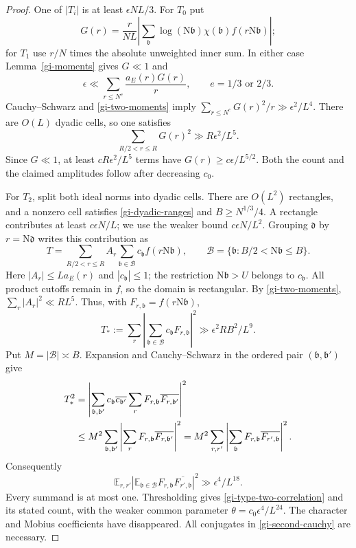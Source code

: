 \begin{proof}
One of $|T_i|$ is at least $\epsilon NL/3$.  For $T_0$ put
\[
 G(r)=\frac{r}{NL}\left|\sum_{\mathfrak b}\log(\mathrm N\mathfrak b)
                   \chi(\mathfrak b)f(r\mathrm N\mathfrak b)\right|;
\]
for $T_1$ use $r/N$ times the absolute unweighted inner sum.  In either
case Lemma~\ref{gi-moments} gives $G\ll1$ and
\[
 \epsilon\ll\sum_{r\leq N^e}\frac{a_E(r)G(r)}r,
 \qquad e=1/3\text{ or }2/3.
\]
Cauchy--Schwarz and \eqref{gi-two-moments} imply
$\sum_{r\leq N^e}G(r)^2/r\gg\epsilon^2/L^4$.
There are $O(L)$ dyadic cells, so one satisfies
\[
 \sum_{R/2<r\leq R}G(r)^2\gg R\epsilon^2/L^5.
\]
Since $G\ll1$, at least $cR\epsilon^2/L^5$ terms have
$G(r)\geq c\epsilon/L^{5/2}$.  Both the count and the claimed amplitudes
follow after decreasing $c_0$.

For $T_2$, split both ideal norms into dyadic cells.  There are $O(L^2)$
rectangles, and a nonzero cell satisfies \eqref{gi-dyadic-ranges} and
$B\geq N^{1/3}/4$.  A rectangle contributes at least $c\epsilon N/L$;
we use the weaker bound $c\epsilon N/L^2$.  Grouping $\mathfrak d$ by
$r=\mathrm N\mathfrak d$ writes this contribution as
\[
 T=\sum_{R/2<r\leq R}A_r\sum_{\mathfrak b\in\mathcal B}c_{\mathfrak b}
                   f(r\mathrm N\mathfrak b),\qquad
 \mathcal B=\{\mathfrak b:B/2<\mathrm N\mathfrak b\leq B\}.
\]
Here $|A_r|\leq L a_E(r)$ and $|c_{\mathfrak b}|\leq1$; the restriction
$\mathrm N\mathfrak b>U$ belongs to $c_{\mathfrak b}$.  All product
cutoffs remain in $f$, so the domain is rectangular.  By
\eqref{gi-two-moments}, $\sum_r|A_r|^2\ll RL^5$.  Thus, with
$F_{r,\mathfrak b}=f(r\mathrm N\mathfrak b)$,
\begin{equation}\label{gi-first-cauchy}
 T_*:=\sum_r\left|\sum_{\mathfrak b\in\mathcal B}
                          c_{\mathfrak b}F_{r,\mathfrak b}\right|^2
          \gg \epsilon^2 RB^2/L^9.
\end{equation}
Put $M=|\mathcal B|\asymp B$.  Expansion and Cauchy--Schwarz in the
ordered pair $(\mathfrak b,\mathfrak b')$ give
\begin{align}
 T_*^2
 &=\left|\sum_{\mathfrak b,\mathfrak b'}
 c_{\mathfrak b}\overline{c_{\mathfrak b'}}
 \sum_r F_{r,\mathfrak b}\overline{F_{r,\mathfrak b'}}\right|^2\notag\\
 &\leq M^2\sum_{\mathfrak b,\mathfrak b'}
       \left|\sum_rF_{r,\mathfrak b}\overline{F_{r,\mathfrak b'}}\right|^2
 =M^2\sum_{r,r'}\left|\sum_{\mathfrak b}
                  F_{r,\mathfrak b}\overline{F_{r',\mathfrak b}}\right|^2.
 \label{gi-second-cauchy}
\end{align}
Consequently
\[
 \mathbb E_{r,r'}\left|\mathbb E_{\mathfrak b\in\mathcal B}
              F_{r,\mathfrak b}\overline{F_{r',\mathfrak b}}\right|^2
       \gg\epsilon^4/L^{18}.
\]
Every summand is at most one.  Thresholding gives
\eqref{gi-type-two-correlation} and its stated count, with the weaker
common parameter $\theta=c_0\epsilon^4/L^{24}$.  The character and Mobius
coefficients have disappeared.  All conjugates in
\eqref{gi-second-cauchy} are necessary.
\end{proof}

